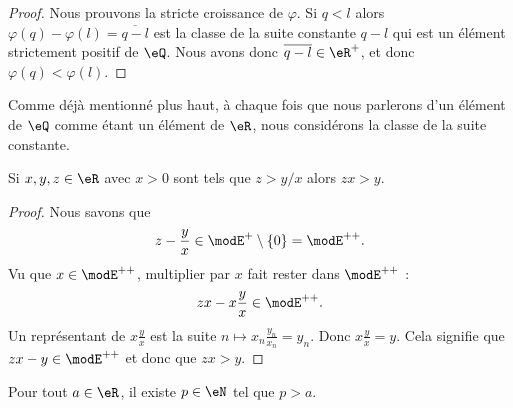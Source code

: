 \begin{proof}
    Nous prouvons la stricte croissance de \( \varphi\). Si \( q< l\) alors \( \varphi(q)-\varphi(l)=\overline{ q-l }\) est la classe de la suite constante \( q-l\) qui est un élément strictement positif de \( \eQ\). Nous avons donc \( \overline{ q-l }\in \eR^+\), et donc \( \varphi(q)<\varphi(l)\).
\end{proof}

\begin{remark}
    Comme déjà mentionné plus haut, à chaque fois que nous parlerons d'un élément de \( \eQ\) comme étant un élément de \( \eR\), nous considérons la classe de la suite constante.
\end{remark}

\begin{lemma}       \label{LemooYNOVooOwoRwD}
    Si \( x,y,z\in \eR\) avec \( x>0\) sont tels que \( z>y/x\) alors \( zx>y\).
\end{lemma}

\begin{proof}
    Nous savons que
    \begin{equation}
        z-\frac{ y }{ x }\in \modE^+\setminus\{ 0 \}=\modE^{++}.
    \end{equation}
    Vu que \( x\in\modE^{++}\), multiplier par \( x\) fait rester dans \( \modE^{++}\) :
    \begin{equation}
        zx-x\frac{ y }{ x }\in \modE^{++}.
    \end{equation}
    Un représentant de \( x\frac{ y }{ x }\) est la suite \( n\mapsto x_n\frac{ y_n }{ x_n }=y_n\). Donc \( x\frac{ y }{ x }=y\). Cela signifie que \( zx-y\in\modE^{++}\) et donc que \( zx>y\).
\end{proof}

\begin{lemma}       \label{LemooMWOUooVWgaEi}
    Pour tout \( a\in \eR\), il existe \( p\in \eN\) tel que \( p>a\).
\end{lemma}


